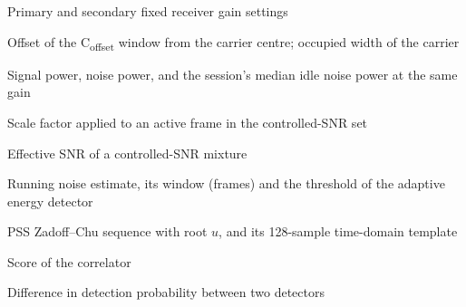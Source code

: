 \begin{description}[style=sameline, leftmargin=3.6cm, labelwidth=3.3cm, font=\normalfont, itemsep=0pt]
  \item[$g_1$, $g_2$] Primary and secondary fixed receiver gain settings
  \item[$f_\mathrm{off}$, $W_\mathrm{occ}$] Offset of the C\textsubscript{offset} window from the carrier centre; occupied width of the carrier
  \item[$P_s$, $P_n$, $\hat{P}_{n,C}$] Signal power, noise power, and the session's median idle noise power at the same gain
  \item[$\alpha$]   Scale factor applied to an active frame in the controlled-SNR set
  \item[$\gamma_\mathrm{eff}$] Effective SNR of a controlled-SNR mixture
  \item[$\hat{\sigma}^2$, $M$, $\kappa$] Running noise estimate, its window (frames) and the threshold of the adaptive energy detector
  \item[$d_u(n)$, $p_u(m)$] PSS Zadoff--Chu sequence with root $u$, and its 128-sample time-domain template
  \item[$\Lambda_\mathrm{PSS}$] Score of the \syncsignal{} correlator
  \item[$\Delta\Pd$] Difference in detection probability between two detectors
\end{description}
